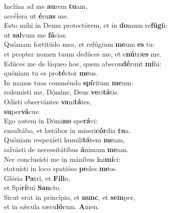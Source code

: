 \evenverse Inclína ad me \textbf{au}rem \textbf{tu}am,~\*\\
\evenverse accélera ut \textbf{é}ru\textbf{as} me.\\
\oddverse Esto mihi in Deum protectórem, et in \textbf{do}mum re\textbf{fú}\textbf{gi}i:~\*\\
\oddverse ut \textbf{sal}vum me \textbf{fá}cias.\\
\evenverse Quóniam fortitúdo mea, et refúgium \textbf{me}um \textbf{es} tu:~\*\\
\evenverse et propter nomen tuum dedúces me, et e\textbf{nú}tri\textbf{es} me.\\
\oddverse Edúces me de láqueo hoc, quem abscon\textbf{dé}runt \textbf{mi}hi:~\*\\
\oddverse quóniam tu es pro\textbf{té}ctor \textbf{me}us.\\
\evenverse In manus tuas comméndo \textbf{spí}ritum \textbf{me}um:~\*\\
\evenverse redemísti me, Dómine, Deus \textbf{ve}ri\textbf{tá}tis.\\
\oddverse Odísti observántes \textbf{va}ni\textbf{tá}tes,~\*\\
\oddverse \textbf{su}per\textbf{vá}cue.\\
\evenverse Ego autem in Dómi\textbf{no} spe\textbf{rá}vi:~\*\\
\evenverse exsultábo, et lætábor in miseri\textbf{cór}dia \textbf{tu}a.\\
\oddverse Quóniam respexísti humili\textbf{tá}tem \textbf{me}am,~\*\\
\oddverse salvásti de necessitátibus \textbf{á}nimam \textbf{me}am.\\
\evenverse Nec conclusísti me in mánibus \textbf{i}ni\textbf{mí}ci:~\*\\
\evenverse statuísti in loco spatióso \textbf{pe}des \textbf{me}os.\\
\oddverse Glória \textbf{Pa}tri, et \textbf{Fí}\textbf{li}o,~\*\\
\oddverse et Spi\textbf{rí}tui \textbf{San}cto.\\
\evenverse Sicut erat in princípio, et \textbf{nunc}, et \textbf{sem}per,~\*\\
\evenverse et in sǽcula sæcu\textbf{ló}rum. \textbf{A}men.\\
